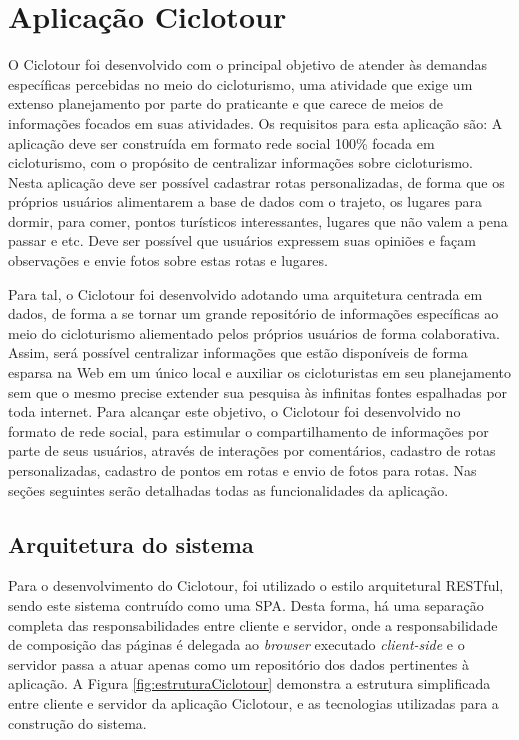 \section{Aplicação Ciclotour}
O Ciclotour foi desenvolvido com o principal objetivo de atender às demandas específicas percebidas no meio do cicloturismo, uma atividade que exige
um extenso planejamento por parte do praticante e que carece de meios de informações focados em suas atividades. Os requisitos para esta aplicação
são: A aplicação deve ser construída em formato rede social 100\% focada em cicloturismo, com o propósito de centralizar informações sobre 
cicloturismo. Nesta aplicação deve ser possível cadastrar rotas personalizadas, de forma que os próprios usuários alimentarem a base de dados com 
o trajeto, os lugares para dormir, para comer, pontos turísticos interessantes, lugares que não valem a pena passar e etc. Deve ser possível que 
usuários expressem suas opiniões e façam observações e envie fotos sobre estas rotas e lugares.

Para tal, o Ciclotour foi desenvolvido adotando uma arquitetura centrada em dados, de forma a se tornar um grande repositório de informações 
específicas ao meio do cicloturismo aliementado pelos próprios usuários de forma colaborativa. Assim, será possível centralizar informações que 
estão disponíveis de forma esparsa na Web em um único local e auxiliar os cicloturistas em seu planejamento sem que o mesmo precise extender sua 
pesquisa às infinitas fontes espalhadas por toda internet. Para alcançar este objetivo, o Ciclotour foi desenvolvido no formato de rede social, para 
estimular o compartilhamento de informações por parte de seus usuários, através de interações por comentários, cadastro de rotas personalizadas, 
cadastro de pontos em rotas e envio de fotos para rotas. Nas seções seguintes serão detalhadas todas as funcionalidades da aplicação.

\subsection{Arquitetura do sistema}
Para o desenvolvimento do Ciclotour, foi utilizado o estilo arquitetural RESTful, sendo este sistema contruído como uma SPA. Desta forma, há
uma separação completa das responsabilidades entre cliente e servidor, onde a responsabilidade de composição das páginas é delegada ao 
\textit{browser} executado \textit{client-side} e o servidor passa a atuar apenas como um repositório dos dados pertinentes à aplicação. A Figura 
\ref{fig:estruturaCiclotour} demonstra a estrutura simplificada entre cliente e servidor da aplicação Ciclotour, e as tecnologias utilizadas para
a construção do sistema.

